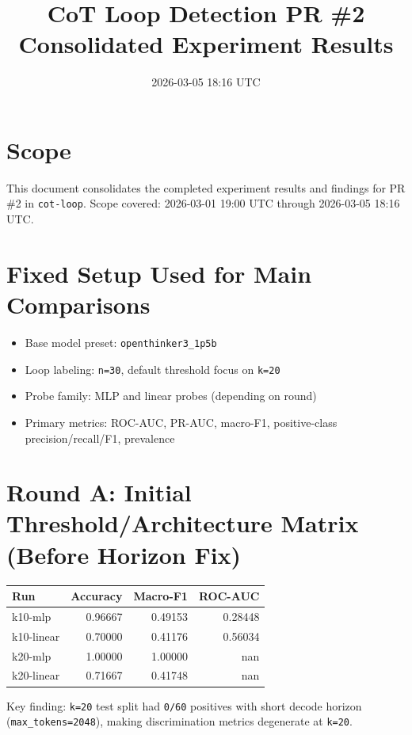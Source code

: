 \documentclass[11pt]{article}
\title{CoT Loop Detection PR \#2\\Consolidated Experiment Results}
\author{}
\date{2026-03-05 18:16 UTC}
\begin{document}
\maketitle

\section*{Scope}
This document consolidates the completed experiment results and findings for PR \#2 in \texttt{cot-loop}. Scope covered: 2026-03-01 19:00 UTC through 2026-03-05 18:16 UTC.

\section*{Fixed Setup Used for Main Comparisons}
\begin{itemize}
  \item Base model preset: \texttt{openthinker3\_1p5b}
  \item Loop labeling: \texttt{n=30}, default threshold focus on \texttt{k=20}
  \item Probe family: MLP and linear probes (depending on round)
  \item Primary metrics: ROC-AUC, PR-AUC, macro-F1, positive-class precision/recall/F1, prevalence
\end{itemize}

\section*{Round A: Initial Threshold/Architecture Matrix (Before Horizon Fix)}
\begin{center}
\begin{tabular}{@{}lrrr@{}}
\toprule
Run & Accuracy & Macro-F1 & ROC-AUC \\
\midrule
k10-mlp & 0.96667 & 0.49153 & 0.28448 \\
k10-linear & 0.70000 & 0.41176 & 0.56034 \\
k20-mlp & 1.00000 & 1.00000 & nan \\
k20-linear & 0.71667 & 0.41748 & nan \\
\bottomrule
\end{tabular}
\end{center}

\noindent
Key finding: \texttt{k=20} test split had \texttt{0/60} positives with short decode horizon (\texttt{max\_tokens=2048}), making discrimination metrics degenerate at \texttt{k=20}.
\end{document}
